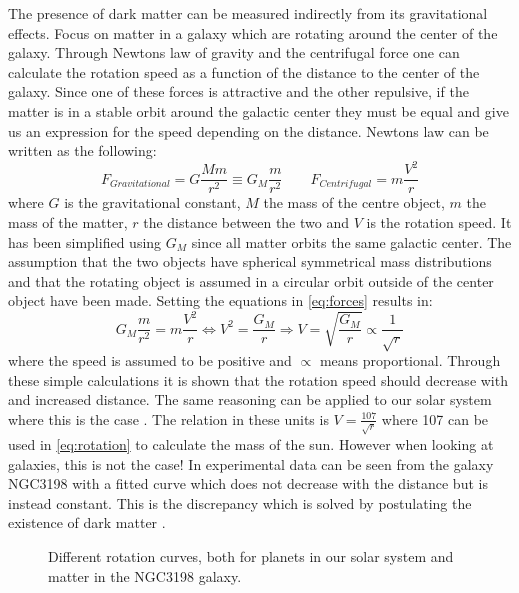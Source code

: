 The presence of dark matter can be measured indirectly from its gravitational effects. Focus on matter in a galaxy which are rotating around the center of the galaxy. Through Newtons law of gravity and the centrifugal force one can calculate the rotation speed as a function of the distance to the center of the galaxy. Since one of these forces is attractive and the other repulsive, if the matter is in a stable orbit around the galactic center they must be equal and give us an expression for the speed depending on the distance. Newtons law can be written as the following:
\begin{equation}\label{eq:forces}
F_{Gravitational}=G \frac{M m}{r^2} \equiv G_M \frac{m}{r^2} \qquad F_{Centrifugal} = m\frac{V^2}{r}
\end{equation}
where $G$ is the gravitational constant, $M$ the mass of the centre object, $m$ the mass of the matter, $r$ the distance between the two and $V$ is the rotation speed. It has been simplified using $G_M$ since all matter orbits the same galactic center. The assumption that the two objects have spherical symmetrical mass distributions and that the rotating object is assumed in a circular orbit outside of the center object have been made. Setting the equations in \eqref{eq:forces} results in:
\begin{equation}\label{eq:rotation}
G_M \frac{m}{r^2} = m\frac{V^2}{r} \Leftrightarrow V^2 =\frac{G_M}{r} \Rightarrow V=\sqrt{\frac{G_M}{r}} \propto \frac{1}{\sqrt{r}}
\end{equation}
where the speed is assumed to be positive and $\propto$ means proportional. Through these simple calculations it is shown that the rotation speed should decrease with and increased distance. The same reasoning can be applied to our solar system where this is the case . The relation in these units is $V=\frac{107}{\sqrt{r}}$ where 107 can be used in \eqref{eq:rotation} to calculate the mass of the sun. However when looking at galaxies, this is not the case! In  experimental data can be seen from the galaxy NGC3198 with a fitted curve which does not decrease with the distance but is instead constant.  This is the discrepancy which is solved by postulating the existence of dark matter \citep{1933AcHPh}.
 \begin{figure}[h] %
    \hfill
    \caption{Different rotation curves, both for planets in our solar system and matter in the NGC3198 galaxy.}
    \label{fig:rotation}
  \end{figure}
